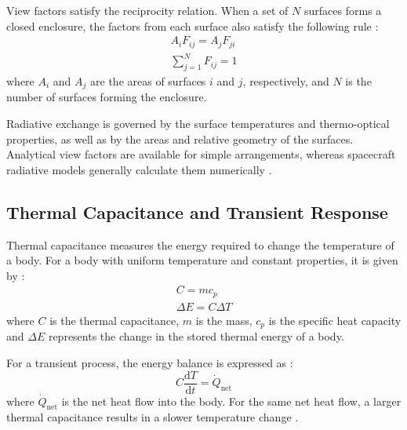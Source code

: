 \begin{samepage}

View factors satisfy the reciprocity relation. When a set of $N$ surfaces forms a closed 
enclosure, the factors from each surface also satisfy the following rule 
\cite{spacethctrl,hmt_f&a}:
\begin{gather}
    A_iF_{ij} = A_jF_{ji}
    \label{eq:view_factor_reciprocity}
    \\[0.3em]
    \sum_{j=1}^{N}F_{ij} = 1
    \label{eq:view_factor_summation}
\end{gather}
where $A_i$ and $A_j$ are the areas of surfaces $i$ and $j$,
respectively, and $N$ is the number of surfaces forming the enclosure.
\end{samepage}

Radiative exchange is governed by the surface temperatures and thermo-optical properties, as well 
as by the areas and relative geometry of the surfaces. Analytical view factors are available 
for simple arrangements, whereas spacecraft radiative models generally calculate them 
numerically \cite{spacethctrl,ecss_man}.

\subsection{Thermal Capacitance and Transient Response}

Thermal capacitance measures the energy required to change the temperature of a body. 
For a body with uniform temperature and constant properties, it is given by 
\cite{th_handbook,hmt_f&a}:
\begin{gather}
    C = mc_p
    \label{eq:thermal_capacitance}
    \\[0.6em]
    \Delta E = C\Delta T
    \label{eq:stored_thermal_energy}
\end{gather}
where $C$ is the thermal capacitance, $m$ is the mass, $c_p$ is the specific heat 
capacity and $\Delta E$ represents the change in the stored thermal energy of a body.

For a transient process, the energy balance is expressed as \cite{spacethctrl}:
\begin{equation}
    C\frac{\mathrm{d}T}{\mathrm{d}t}
    =
    \dot{Q}_{\mathrm{net}}
    \label{eq:transient_energy_balance}
\end{equation}
where $\dot{Q}_{\mathrm{net}}$ is the net heat flow into the body. For the same net 
heat flow, a larger thermal capacitance results in a slower temperature change 
\cite{hmt_f&a}.

